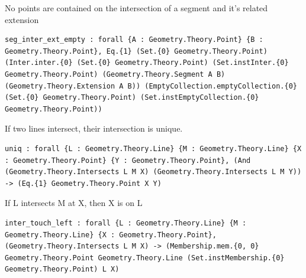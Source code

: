 \begin{theorem}
  \label{Geometry.Theory.Intersection.seg_inter_ext_empty}
  \leanok
  No points are contained on the intersection of a segment and it's related extension 
\begin{verbatim}seg_inter_ext_empty : forall {A : Geometry.Theory.Point} {B : Geometry.Theory.Point}, Eq.{1} (Set.{0} Geometry.Theory.Point) (Inter.inter.{0} (Set.{0} Geometry.Theory.Point) (Set.instInter.{0} Geometry.Theory.Point) (Geometry.Theory.Segment A B) (Geometry.Theory.Extension A B)) (EmptyCollection.emptyCollection.{0} (Set.{0} Geometry.Theory.Point) (Set.instEmptyCollection.{0} Geometry.Theory.Point))\end{verbatim}
\end{theorem}

\begin{theorem}
  \label{Geometry.Theory.Intersection.uniq}
  \leanok
  If two lines intersect, their intersection is unique. 
\begin{verbatim}uniq : forall {L : Geometry.Theory.Line} {M : Geometry.Theory.Line} {X : Geometry.Theory.Point} {Y : Geometry.Theory.Point}, (And (Geometry.Theory.Intersects L M X) (Geometry.Theory.Intersects L M Y)) -> (Eq.{1} Geometry.Theory.Point X Y)\end{verbatim}
\end{theorem}

\begin{theorem}
  \label{Geometry.Theory.Intersection.inter_touch_left}
  \leanok
  If L intersects M at X, then X is on L 
\begin{verbatim}inter_touch_left : forall {L : Geometry.Theory.Line} {M : Geometry.Theory.Line} {X : Geometry.Theory.Point}, (Geometry.Theory.Intersects L M X) -> (Membership.mem.{0, 0} Geometry.Theory.Point Geometry.Theory.Line (Set.instMembership.{0} Geometry.Theory.Point) L X)\end{verbatim}
\end{theorem}

